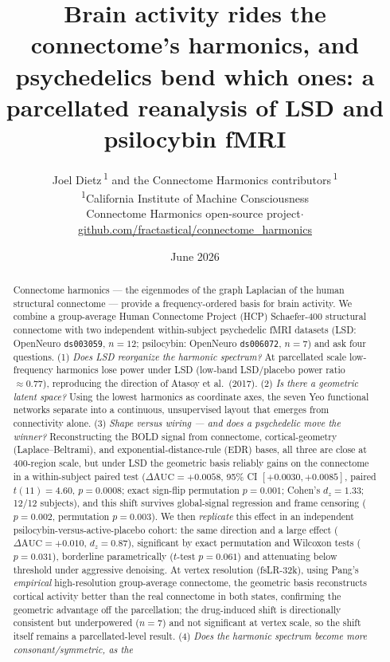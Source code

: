 \documentclass[10pt,a4paper]{article}
\title{\bfseries Brain activity rides the connectome's harmonics, and psychedelics
bend which ones: a parcellated reanalysis of LSD and psilocybin fMRI}
\author{Joel Dietz\,\textsuperscript{1} \quad and the Connectome Harmonics contributors\,\textsuperscript{1}\\[0.5em]
\small \textsuperscript{1}California Institute of Machine Consciousness\\
\small Connectome Harmonics open-source project\;$\cdot$\;
\small \href{https://github.com/fractastical/connectome_harmonics}{github.com/fractastical/connectome\_harmonics}}
\date{June 2026}
\begin{document}
\maketitle

\begin{abstract}
\noindent
Connectome harmonics --- the eigenmodes of the graph Laplacian of the human
structural connectome --- provide a frequency-ordered basis for brain activity.
We combine a group-average Human Connectome Project (HCP) Schaefer-400 structural
connectome with two independent within-subject psychedelic fMRI datasets
(LSD: OpenNeuro \texttt{ds003059}, $n=12$; psilocybin: OpenNeuro \texttt{ds006072},
$n=7$) and ask four questions. (1) \emph{Does LSD reorganize the harmonic
spectrum?} At parcellated scale low-frequency harmonics lose power under LSD
(low-band LSD/placebo power ratio $\approx 0.77$), reproducing the direction of
Atasoy et al.\ (2017). (2) \emph{Is there a geometric latent space?} Using the
lowest harmonics as coordinate axes, the seven Yeo functional networks separate
into a continuous, unsupervised layout that emerges from connectivity alone.
(3) \emph{Shape versus wiring --- and does a psychedelic move the winner?}
Reconstructing the BOLD signal from connectome, cortical-geometry (Laplace--Beltrami),
and exponential-distance-rule (EDR) bases, all three are close at 400-region scale,
but under LSD the geometric basis reliably gains on the connectome in a
within-subject paired test ($\Delta\mathrm{AUC}=+0.0058$, 95\% CI
$[+0.0030,+0.0085]$, paired $t(11)=4.60$, $p=0.0008$; exact sign-flip permutation
$p=0.001$; Cohen's $d_z=1.33$; 12/12 subjects), and this shift survives global-signal
regression and frame censoring ($p=0.002$, permutation $p=0.003$). We then
\emph{replicate} this effect in an independent psilocybin-versus-active-placebo
cohort: the same direction and a large effect ($\Delta\mathrm{AUC}=+0.010$,
$d_z=0.87$), significant by exact permutation and Wilcoxon tests ($p=0.031$),
borderline parametrically ($t$-test $p=0.061$) and attenuating below threshold
under aggressive denoising. At vertex resolution (fsLR-32k), using Pang's
\emph{empirical} high-resolution group-average connectome, the geometric basis
reconstructs cortical activity better than the real connectome in both states,
confirming the geometric advantage off the parcellation; the drug-induced shift is
directionally consistent but underpowered ($n=7$) and not significant at vertex scale,
so the shift itself remains a parcellated-level result.
(4) \emph{Does the harmonic spectrum become more consonant/symmetric, as the
}
\end{abstract}
\end{document}
